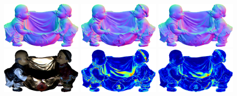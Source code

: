      \\
    \includegraphics[width=0.30\textwidth]{ch-psfcn/images/Results/DiLiGenT/GT/harvestPNGGT_normal.png}
    \includegraphics[width=0.30\textwidth]{ch-psfcn/images/Results/DiLiGenT/PS-FCN/harvestPNGDiLiGenT_normal.png}
    \includegraphics[width=0.30\textwidth]{ch-psfcn/images/Results/DiLiGenT/SVBRDF/PS-FCN_normalized/harvestPNGDiLiGenT_normal.png}
    \\
    \includegraphics[width=0.30\textwidth]{ch-psfcn/images/Results/DiLiGenT/GT/4.0_harvestPNG_001.png}
    \includegraphics[width=0.30\textwidth]{ch-psfcn/images/Results/DiLiGenT/PS-FCN/harvestPNGDiLiGenT_diff.png}
    \includegraphics[width=0.30\textwidth]{ch-psfcn/images/Results/DiLiGenT/SVBRDF/PS-FCN_normalized/harvestPNGDiLiGenT_diff.png}
